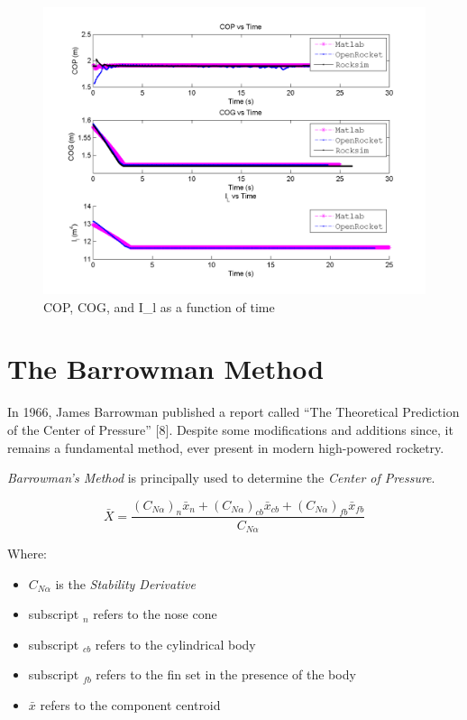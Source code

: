 \documentclass[]{book}
\providecommand{\tightlist}{%
  \setlength{\itemsep}{0pt}\setlength{\parskip}{0pt}}
\begin{document}
\begin{figure}[htbp]
\centering
\includegraphics{images/plots/error_cog_cop_il_plot.png}
\caption{COP, COG, and I\_l as a function of time
\label{cop_cog_il_figure}}
\end{figure}

\clearpage

\chapter{The Barrowman Method}\label{the-barrowman-method}

In 1966, James Barrowman published a report called ``The Theoretical
Prediction of the Center of Pressure'' {[}8{]}. Despite some
modifications and additions since, it remains a fundamental method, ever
present in modern high-powered rocketry.

\emph{Barrowman's Method} is principally used to determine the
\emph{Center of Pressure}.

\begin{equation}
\label{rocket_center_of_pressure}
\bar{X} = 
\dfrac
{ \left( C_{N \alpha} \right)_n \bar{x}_n + \left( C_{N \alpha} \right)_{cb} \bar{x}_{cb} + \left( C_{N \alpha} \right)_{fb} \bar{x}_{fb} }
{ C_{N \alpha}  }
\end{equation}

Where:

\begin{itemize}
\tightlist
\item
  \(C_{N \alpha}\) is the \emph{Stability Derivative}
\item
  subscript \(_n\) refers to the nose cone
\item
  subscript \(_{cb}\) refers to the cylindrical body
\item
  subscript \(_{fb}\) refers to the fin set in the presence of the body
\item
  \(\bar{x}\) refers to the component centroid
\end{itemize}
\end{document}
